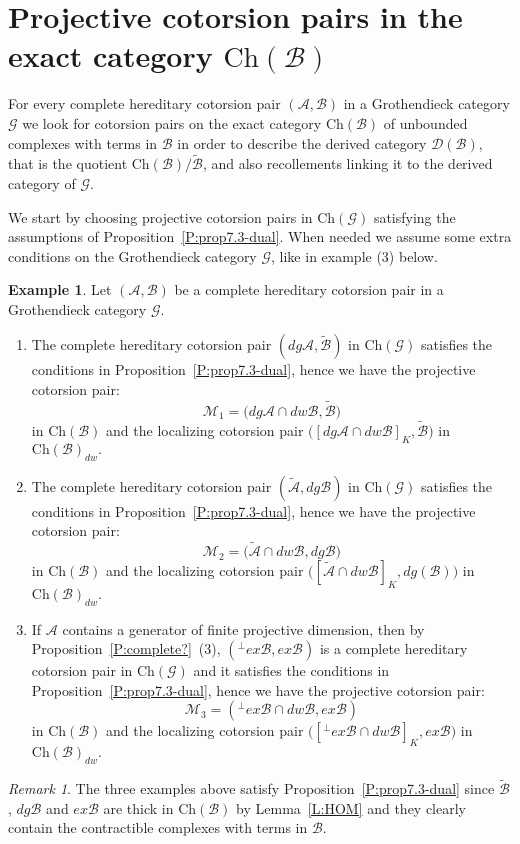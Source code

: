 \documentclass[11pt,a4paper,reqno]{amsart}
\newcommand{\A}{\mathcal{A}}
\newcommand{\B}{\mathcal{B}}
\newcommand{\D}{\mathcal{D}}
\newcommand{\G}{\mathcal{G}}
\newcommand{\M}{\mathcal{M}}
\newcommand{\Ch}{\mathrm{Ch}}
\theoremstyle{plain}
\theoremstyle{definition}
\newtheorem{expl}[thm]{Example}
\theoremstyle{remark}
\newtheorem{rem}[thm]{Remark}
\begin{document}
%
%
%

\section{Projective cotorsion pairs in the exact category $\Ch(\B)$}\label{S:B}



For every complete hereditary cotorsion pair $(\A, \B)$ in a Grothendieck category $\G$ we look for cotorsion pairs on the exact category $\Ch(\B)$ of unbounded complexes with terms in $\B$ in order to describe the derived category $\D( \B)$, that is the quotient $\Ch( \B)/\widetilde{\B}$, and also recollements linking it to the derived category of $\G$.

We start by choosing projective cotorsion pairs in $\Ch(\G)$ satisfying the assumptions of Proposition~\ref{P:prop7.3-dual}.
When needed we assume some extra conditions on the Grothendieck category $\G$, like in example (3) below.


\begin{expl}\label{E:examples-proj} Let $(\A, \B)$ be a complete hereditary cotorsion pair in a  Grothendieck category $\G$.
 \begin{enumerate}
%
%
\item The complete hereditary cotorsion pair $(dg \A, \widetilde{\B})$ in $\Ch(\G)$ satisfies the conditions in  Proposition~\ref{P:prop7.3-dual}, hence we have the projective cotorsion pair:
%
 \[\M_1=\Big(dg{\A}\cap dw \B, \widetilde{\B}\Big)\] in $\Ch(\B)$ and the localizing cotorsion pair $\Big([dg{\A}\cap dw \B]_K,  \widetilde{\B}\Big)$ in $\Ch(\B)_{dw}.$
\item The complete hereditary cotorsion pair $(\widetilde{\A}, dg \B)$ in $\Ch(\G)$ satisfies the conditions in  Proposition~\ref{P:prop7.3-dual}, hence we have the projective cotorsion pair:
%
 \[\M_2=\Big(\widetilde{\A}\cap dw \B, dg \B\Big)\] in $\Ch(\B)$ and the localizing cotorsion pair $\Big([\widetilde{\A}\cap dw \B]_K, dg (\B)\Big)$ in $\Ch(\B)_{dw}.$

%
%
%

\item If $\A$ contains a generator of finite projective dimension, then by Proposition~\ref{P:complete?}~(3), $({}^\perp{} ex\B, ex\B)$ is a complete hereditary cotorsion pair in $\Ch(\G)$ and it satisfies the conditions in  Proposition~\ref{P:prop7.3-dual}, hence  we have the projective cotorsion pair:
 \[\M_3=({}^\perp{} ex\B\cap dw \B, ex\B)\] in $\Ch(\B)$ and the localizing cotorsion pair $\Big([{}^\perp{} ex\B\cap dw \B]_K, ex\B\Big)$ in $\Ch(\B)_{dw}.$

 \end{enumerate}
 \end{expl}
 \begin{rem}\label{R:thick-1} The three examples above satisfy Proposition~\ref{P:prop7.3-dual} since $\tilde{\B}$, $dg\B$ and $ex\B$  are thick in $\Ch(\B)$ by Lemma~\ref{L:HOM} and they clearly contain the contractible complexes with terms in $\B$.
 \end{rem}
\end{document}
